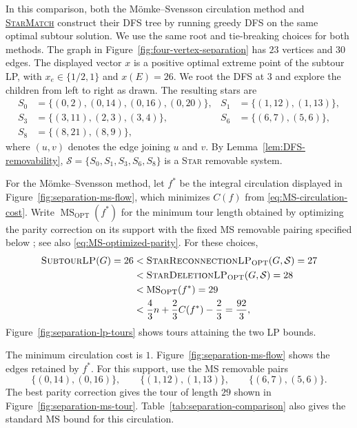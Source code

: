 \documentclass[11pt]{amsart}
\newcommand{\1}{\mathbbm{1}}
\newcommand{\ALG}{\textsc{StarMatch}}
\newcommand{\SubtourLP}{\textsc{SubtourLP}}
\newcommand{\MSopt}{\operatorname{MS}_{\mathrm{OPT}}}
\newcommand{\LPone}{\textsc{StarDeletionLP}}
\newcommand{\LPtwo}{\textsc{StarReconnectionLP}}
\begin{document}
In this comparison, both the M\"omke--Svensson circulation method
and \hyperref[proc:algorithm]{\ALG} construct their DFS tree by
running greedy DFS on the same optimal subtour solution. We use
the same root and tie-breaking choices for both methods.
The graph in Figure~\ref{fig:four-vertex-separation} has $23$ vertices
and $30$ edges. The displayed vector $x$ is a positive optimal extreme
point of the subtour LP, with $x_e\in\{1/2,1\}$ and $x(E)=26$.
We root the DFS at $3$ and explore the children from left to right
as drawn. The resulting stars are
\[
\begin{aligned}
 S_0&=\{(0,2),(0,14),(0,16),(0,20)\},&
 S_1&=\{(1,12),(1,13)\},\\
 S_3&=\{(3,11),(2,3),(3,4)\},&
 S_6&=\{(6,7),(5,6)\},\\
 S_8&=\{(8,21),(8,9)\},
\end{aligned}
\]
where $(u,v)$ denotes the edge joining $u$ and $v$.
By Lemma~\ref{lem:DFS-removability},
$\mathcal S=\{S_0,S_1,S_3,S_6,S_8\}$ is a \textsc{Star} removable system.


For the M\"omke--Svensson method, let $f^*$ be the integral
circulation displayed in Figure~\ref{fig:separation-ms-flow},
which minimizes $C(f)$ from \eqref{eq:MS-circulation-cost}.
Write $\MSopt(f^*)$ for the minimum tour length
obtained by optimizing the parity correction on its support
with the fixed MS removable pairing specified below
\cite[proof of Theorem~12.3]{TraubVygen}; see also
\eqref{eq:MS-optimized-parity}. For these choices,
\[
 \begin{aligned}
 {\text{\SubtourLP}(G)}=26
 &<\text{\LPtwo}_{\mathrm{OPT}}(G,\mathcal S)=27\\
 &<\text{\LPone}_{\mathrm{OPT}}(G,\mathcal S)=28\\
 &<\MSopt(f^*)=29\\
 &<\frac43n+\frac23C(f^*)-\frac23=\frac{92}{3},
 \end{aligned}
\]
Figure~\ref{fig:separation-lp-tours} shows tours attaining the two LP
bounds.

The minimum circulation cost is $1$.
Figure~\ref{fig:separation-ms-flow} shows the edges retained by
$f^*$. For this support, use the MS removable pairs
\[
 \{(0,14),(0,16)\},\qquad
 \{(1,12),(1,13)\},\qquad
 \{(6,7),(5,6)\}.
\]
The best parity correction gives the tour of length $29$ shown
in Figure~\ref{fig:separation-ms-tour}.
Table~\ref{tab:separation-comparison} also gives the standard MS
bound for this circulation.
\end{document}
